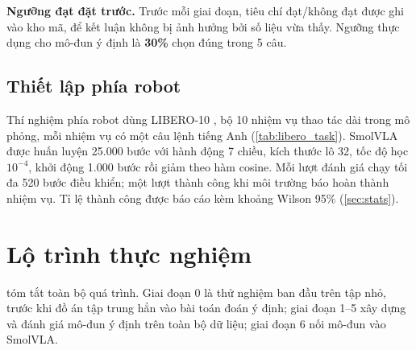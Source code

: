 \documentclass[a4paper,oneside]{report}
\begin{document}
\textbf{Ngưỡng đạt đặt trước.} Trước mỗi giai đoạn, tiêu chí đạt/không đạt được ghi vào kho mã, để kết luận không bị ảnh hưởng bởi số liệu vừa thấy. Ngưỡng thực dụng cho mô-đun ý định là \textbf{30\%} chọn đúng trong 5 câu.


\subsection{Thiết lập phía robot}

Thí nghiệm phía robot dùng LIBERO-10 \citep{liu2023libero}, bộ 10 nhiệm vụ thao tác dài trong mô phỏng, mỗi nhiệm vụ có một câu lệnh tiếng Anh (\cref{tab:libero_task}). SmolVLA được huấn luyện 25.000 bước với hành động 7 chiều, kích thước lô 32, tốc độ học $10^{-4}$, khởi động 1.000 bước rồi giảm theo hàm cosine. Mỗi lượt đánh giá chạy tối đa 520 bước điều khiển; một lượt thành công khi môi trường báo hoàn thành nhiệm vụ. Tỉ lệ thành công được báo cáo kèm khoảng Wilson 95\% (\cref{sec:stats}).

\section{Lộ trình thực nghiệm}
\label{sec:roadmap}

 tóm tắt toàn bộ quá trình. Giai đoạn 0 là thử nghiệm ban đầu trên tập nhỏ, trước khi đồ án tập trung hẳn vào bài toán đoán ý định; giai đoạn 1--5 xây dựng và đánh giá mô-đun ý định trên toàn bộ dữ liệu; giai đoạn 6 nối mô-đun vào SmolVLA.
\end{document}
